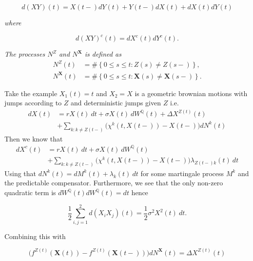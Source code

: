 \documentclass[a4paper,12pt,openany]{book}
\begin{document}
\[
d(XY)(t)=X(t-)dY(t)+Y(t-)dX(t)+dX(t)dY(t)
\]

\emph{where}

\[
d(XY)^c(t)=dX^c(t)dY^c(t).
\]

\emph{The processes \(N^Z\) and \(N^\mathbf X\) is defined as}
\begin{align*}
N^Z(t)&=\#\left\{ 0\le s\le t: Z(s)\ne Z(s-) \right\},\\
N^\mathbf X(t)&=\#\left\{ 0\le s\le t: \mathbf X(s)\ne \mathbf X(s-) \right\}.
\end{align*}

Take the example \(X_1(t)=t\) and \(X_2=X\) is a geometric brownian motions with jumps according to \(Z\) and deterministic jumps given \(Z\) i.e.
\begin{align*}
dX(t)&=rX(t)\ dt+\sigma X(t)\ dW^\mathbb Q(t)+\Delta X^{Z(t)}(t)\\
&+\sum_{k:k\ne Z(t-)}\Big(\chi^k(t,X(t-))-X(t-)\Big)dN^{k}(t)
\end{align*}
Then we know that
\begin{align*}
dX^c(t)&=rX(t)\ dt+\sigma X(t)\ dW^\mathbb Q(t)\\
&+\sum_{k:k\ne Z(t-)}\Big(\chi^k(t,X(t-))-X(t-)\Big)\lambda_{Z(t-)k}(t)\ dt
\end{align*}
Using that \(dN^k(t)=dM^k(t)+\lambda_k(t)\ dt\) for some martingale process \(M^k\) and the predictable compensator. Furthermore, we see that the only non-zero quadratic term is \(dW^\mathbb Q(t)dW^\mathbb Q(t)=dt\) hence

\[
\frac{1}{2}\sum_{i,j=1}^2d(X_iX_j)(t)=\frac{1}{2}\sigma^2X^2(t)\ dt.
\]

Combining this with

\[
\Big(f^{Z(t)}(\mathbf X(t))-f^{Z(t)}(\mathbf X(t-))\Big)dN^\mathbf X(t)=\Delta X^{Z(t)}(t)
\]
\end{document}
